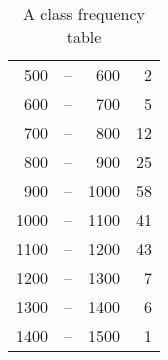   \begin{table}[H]
    \centering
    \begin{tabular}{rrrr}
      500  & -- & 600  & 2  \\
      600  & -- & 700  & 5  \\
      700  & -- & 800  & 12 \\
      800  & -- & 900  & 25 \\
      900  & -- & 1000 & 58 \\
      1000 & -- & 1100 & 41 \\
      1100 & -- & 1200 & 43 \\
      1200 & -- & 1300 & 7  \\
      1300 & -- & 1400 & 6  \\
      1400 & -- & 1500 & 1  \\
      \bottomrule
    \end{tabular}
    \caption{A class frequency table}
    \label{tbl:class-frequency-table}
  \end{table}

